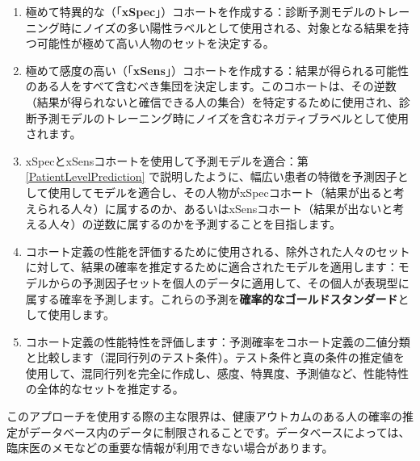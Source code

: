 \documentclass[
  11pt]{book}
\theoremstyle{definition}
\theoremstyle{definition}
\theoremstyle{definition}
\theoremstyle{definition}
\theoremstyle{remark}
\begin{document}
\begin{enumerate}
\def\labelenumi{\arabic{enumi}.}
\item
  極めて特異的な（「\textbf{xSpec}」）コホートを作成する：診断予測モデルのトレーニング時にノイズの多い陽性ラベルとして使用される、対象となる結果を持つ可能性が極めて高い人物のセットを決定する。
\item
  極めて感度の高い（「\textbf{xSens}」）コホートを作成する：結果が得られる可能性のある人をすべて含むべき集団を決定します。このコホートは、その逆数（結果が得られないと確信できる人の集合）を特定するために使用され、診断予測モデルのトレーニング時にノイズを含むネガティブラベルとして使用されます。
\item
  xSpecとxSensコホートを使用して予測モデルを適合：第 \ref{PatientLevelPrediction} で説明したように、幅広い患者の特徴を予測因子として使用してモデルを適合し、その人物がxSpecコホート（結果が出ると考えられる人々）に属するのか、あるいはxSensコホート（結果が出ないと考える人々）の逆数に属するのかを予測することを目指します。
\item
  コホート定義の性能を評価するために使用される、除外された人々のセットに対して、結果の確率を推定するために適合されたモデルを適用します：モデルからの予測因子セットを個人のデータに適用して、その個人が表現型に属する確率を予測します。これらの予測を\textbf{確率的なゴールドスタンダード}として使用します。
\item
  コホート定義の性能特性を評価します：予測確率をコホート定義の二値分類と比較します（混同行列のテスト条件）。テスト条件と真の条件の推定値を使用して、混同行列を完全に作成し、感度、特異度、予測値など、性能特性の全体的なセットを推定する。
\end{enumerate}

このアプローチを使用する際の主な限界は、健康アウトカムのある人の確率の推定がデータベース内のデータに制限されることです。データベースによっては、臨床医のメモなどの重要な情報が利用できない場合があります。
\end{document}
